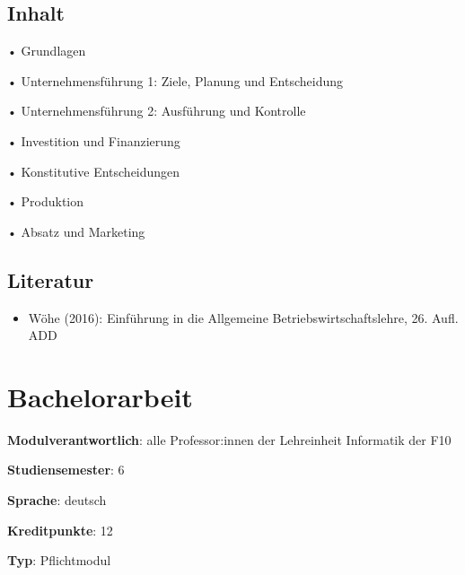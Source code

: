 \hypertarget{inhaltpathlabelmi-2017modulbeschreibungen-bachelorba_bwl1}{%
\section*{Inhalt\label{/mi-2017/modulbeschreibungen-bachelor/BA_BWL1}}\label{inhaltpathlabelmi-2017modulbeschreibungen-bachelorba_bwl1}}

• Grundlagen

• Unternehmensführung 1: Ziele, Planung und Entscheidung

• Unternehmensführung 2: Ausführung und Kontrolle

• Investition und Finanzierung

• Konstitutive Entscheidungen

• Produktion

• Absatz und Marketing

\hypertarget{literaturpathlabelmi-2017modulbeschreibungen-bachelorba_bwl1}{%
\section*{Literatur\label{/mi-2017/modulbeschreibungen-bachelor/BA_BWL1}}\label{literaturpathlabelmi-2017modulbeschreibungen-bachelorba_bwl1}}

\begin{itemize}
\tightlist
\item
  Wöhe (2016): Einführung in die Allgemeine Betriebswirtschaftslehre,
  26. Aufl. ADD
\end{itemize}

\hypertarget{bachelorarbeitpathlabelmi-2017modulbeschreibungen-bachelorba_bachelorarbeit}{%
\chapter{Bachelorarbeit\label{/mi-2017/modulbeschreibungen-bachelor/BA_Bachelorarbeit}}\label{bachelorarbeitpathlabelmi-2017modulbeschreibungen-bachelorba_bachelorarbeit}}

\begin{modulHead}
\textbf{Modulverantwortlich}: alle Professor:innen
der Lehreinheit Informatik der
F10
\end{modulHead}
\begin{modulHead}
\textbf{Studiensemester}:
6
\end{modulHead}
\begin{modulHead}
\textbf{Sprache}:
deutsch
\end{modulHead}
\begin{modulHead}
\textbf{Kreditpunkte}:
12
\end{modulHead}
\begin{modulHead}
\textbf{Typ}:
Pflichtmodul
\end{modulHead}


